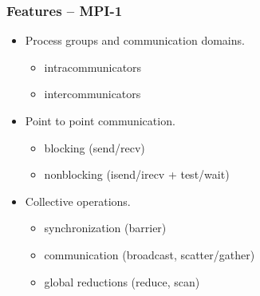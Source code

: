 \begin{frame}
  \frametitle{Features -- MPI-1}
  \begin{itemize}
  \item Process groups and communication domains.
    \begin{itemize}
    \item intracommunicators
    \item intercommunicators
    \end{itemize}
  \item Point to point communication.
    \begin{itemize}
    \item blocking (send/recv)
    \item nonblocking (isend/irecv + test/wait)
    \end{itemize}
  \item Collective operations.
    \begin{itemize}
    \item synchronization (barrier)
    \item communication (broadcast, scatter/gather)
    \item global reductions (reduce, scan)
    \end{itemize}
  \end{itemize}
\end{frame}



